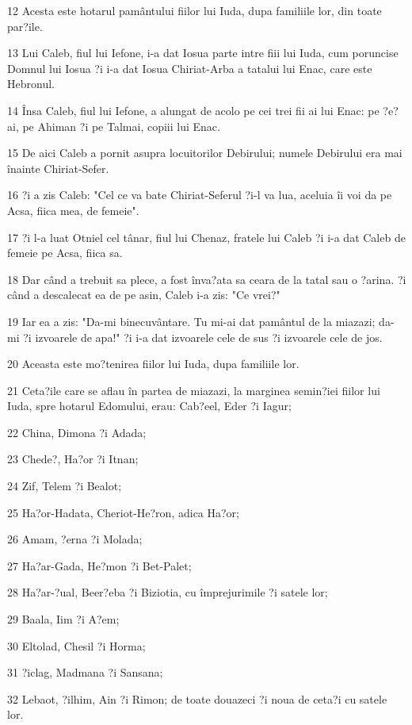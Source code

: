 \par 12 Acesta este hotarul pamântului fiilor lui Iuda, dupa familiile lor, din toate par?ile.
\par 13 Lui Caleb, fiul lui Iefone, i-a dat Iosua parte intre fiii lui Iuda, cum poruncise Domnul lui Iosua ?i i-a dat Iosua Chiriat-Arba a tatalui lui Enac, care este Hebronul.
\par 14 Însa Caleb, fiul lui Iefone, a alungat de acolo pe cei trei fii ai lui Enac: pe ?e?ai, pe Ahiman ?i pe Talmai, copiii lui Enac.
\par 15 De aici Caleb a pornit asupra locuitorilor Debirului; numele Debirului era mai înainte Chiriat-Sefer.
\par 16 ?i a zis Caleb: "Cel ce va bate Chiriat-Seferul ?i-l va lua, aceluia îi voi da pe Acsa, fiica mea, de femeie".
\par 17 ?i l-a luat Otniel cel tânar, fiul lui Chenaz, fratele lui Caleb ?i i-a dat Caleb de femeie pe Acsa, fiica sa.
\par 18 Dar când a trebuit sa plece, a fost înva?ata sa ceara de la tatal sau o ?arina. ?i când a descalecat ea de pe asin, Caleb i-a zis: "Ce vrei?"
\par 19 Iar ea a zis: "Da-mi binecuvântare. Tu mi-ai dat pamântul de la miazazi; da-mi ?i izvoarele de apa!" ?i i-a dat izvoarele cele de sus ?i izvoarele cele de jos.
\par 20 Aceasta este mo?tenirea fiilor lui Iuda, dupa familiile lor.
\par 21 Ceta?ile care se aflau în partea de miazazi, la marginea semin?iei fiilor lui Iuda, spre hotarul Edomului, erau: Cab?eel, Eder ?i Iagur;
\par 22 China, Dimona ?i Adada;
\par 23 Chede?, Ha?or ?i Itnan;
\par 24 Zif, Telem ?i Bealot;
\par 25 Ha?or-Hadata, Cheriot-He?ron, adica Ha?or;
\par 26 Amam, ?erna ?i Molada;
\par 27 Ha?ar-Gada, He?mon ?i Bet-Palet;
\par 28 Ha?ar-?ual, Beer?eba ?i Biziotia, cu împrejurimile ?i satele lor;
\par 29 Baala, Iim ?i A?em;
\par 30 Eltolad, Chesil ?i Horma;
\par 31 ?iclag, Madmana ?i Sansana;
\par 32 Lebaot, ?ilhim, Ain ?i Rimon; de toate douazeci ?i noua de ceta?i cu satele lor.
